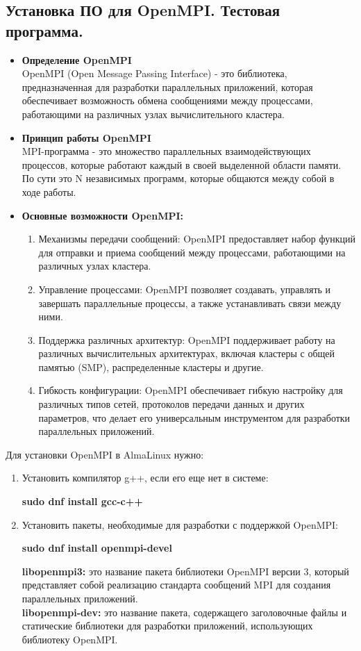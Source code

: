 \documentclass[11pt,a4paper,final]{article}
\begin{document}
\subsection{Установка ПО для OpenMPI. Тестовая программа.}
\begin{itemize}
	\item {\bf Определение OpenMPI}  \\
	OpenMPI (Open Message Passing Interface) - это библиотека, предназначенная для разработки параллельных приложений, которая обеспечивает возможность обмена сообщениями между процессами, работающими на различных узлах вычислительного кластера.
	\item {\bf Принцип работы OpenMPI}  \\
	MPI-программа - это множество параллельных взаимодействующих процессов, которые работают каждый в своей выделенной области памяти. По сути это N независимых программ, которые общаются между собой в ходе работы.
	\item {\bf Основные возможности OpenMPI:} 
	\begin{enumerate}
		\item Механизмы передачи сообщений: OpenMPI предоставляет набор функций для отправки и приема сообщений между процессами, работающими на различных узлах кластера.
		\item Управление процессами: OpenMPI позволяет создавать, управлять и завершать параллельные процессы, а также устанавливать связи между ними.
		\item Поддержка различных архитектур: OpenMPI поддерживает работу на различных вычислительных архитектурах, включая кластеры с общей памятью (SMP), распределенные кластеры и другие.
		\item Гибкость конфигурации: OpenMPI обеспечивает гибкую настройку для различных типов сетей, протоколов передачи данных и других параметров, что делает его универсальным инструментом для разработки параллельных приложений.
	\end{enumerate}
\end{itemize}
Для установки OpenMPI в AlmaLinux нужно:
\begin{enumerate}
	\item Установить компилятор g++, если его еще нет в системе:
	\begin{center}
		{\bf sudo dnf install gcc-c++}
	\end{center}
	\item Установить пакеты, необходимые для разработки с поддержкой OpenMPI:
	\begin{center}
		{\bf sudo dnf install openmpi-devel}
	\end{center}
	{\bf libopenmpi3:} это название пакета библиотеки OpenMPI версии 3, который представляет собой реализацию стандарта сообщений MPI для создания параллельных приложений. \\
	
	{\bf libopenmpi-dev:} это название пакета, содержащего заголовочные файлы и статические библиотеки для разработки приложений, использующих библиотеку OpenMPI.
\end{enumerate}
\end{document}

